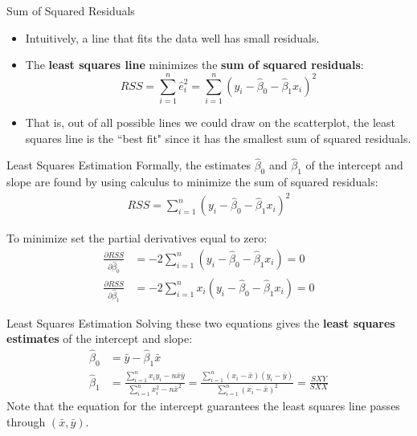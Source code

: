 \documentclass[10pt]{beamer}
\begin{document}
\begin{frame}{Sum of Squared Residuals}
\begin{itemize}
\item Intuitively, a line that fits the data well has small residuals.
\vspace{5pt}
\item The \textbf{least squares line} minimizes the \textbf{sum of squared residuals}:
$$RSS = \sum_{i=1}^n \hat{e}_i^2 = \sum_{i=1}^n (y_i - \hat{\beta}_0 - \hat{\beta}_1 x_i)^2$$
\vspace{5pt}
\item That is, out of all possible lines we could draw on the scatterplot, the least squares line is the ``best fit" since it has the smallest sum of squared residuals.
\end{itemize}
\end{frame}

\begin{frame}{Least Squares Estimation}
Formally, the estimates $\hat{\beta}_0$ and $\hat{\beta}_1$ of the intercept and slope are found by using calculus to minimize the sum of squared residuals:
\begin{align*}
RSS = \sum_{i=1}^n (y_i - \hat{\beta}_0 - \hat{\beta}_1 x_i)^2
\end{align*}

To minimize set the partial derivatives equal to zero:\\
\begin{align*}
\frac{\partial RSS}{\partial \hat{\beta}_0} &= -2 \sum_{i=1}^n (y_i - \hat{\beta}_0 - \hat{\beta}_1 x_i) = 0\\
\frac{\partial RSS}{\partial \hat{\beta}_1} &= -2 \sum_{i=1}^n x_i (y_i - \hat{\beta}_0 - \hat{\beta}_1 x_i) = 0
\end{align*}
\end{frame}

\begin{frame}{Least Squares Estimation}
Solving these two equations gives the \textbf{least squares estimates} of the intercept and slope:
\begin{align*}
\hat{\beta}_0 &= \bar{y} - \hat{\beta}_1 \bar{x}\\
\hat{\beta}_1 &= \frac{\sum_{i=1}^n x_iy_i - n\bar{x}\bar{y}}{\sum_{i=1}^n x_i^2 - n \bar{x}^2} = \frac{\sum_{i=1}^n (x_i - \bar{x})(y_i - \bar{y})}{\sum_{i=1}^n (x_i - \bar{x})^2} = \frac{SXY}{SXX} \end{align*}
Note that the equation for the intercept guarantees the least squares line passes through $(\bar{x}, \bar{y})$.
\end{frame}
\end{document}
